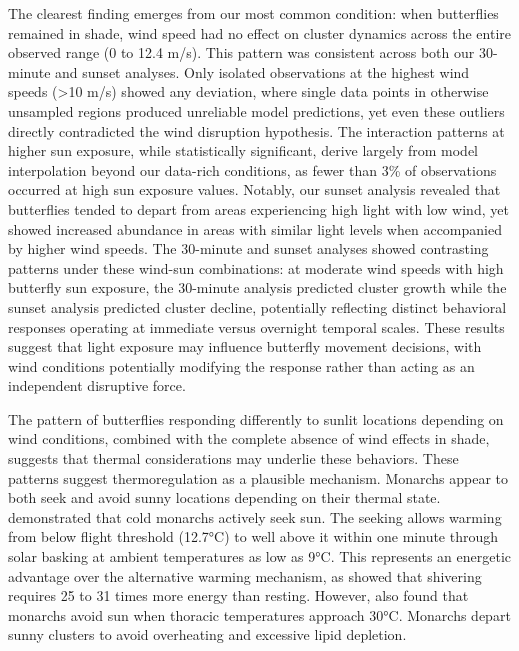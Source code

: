 The clearest finding emerges from our most common condition: when butterflies remained in shade, wind speed had no effect on cluster dynamics across the entire observed range (0 to 12.4 m/s). This pattern was consistent across both our 30-minute and sunset analyses. Only isolated observations at the highest wind speeds (>10 m/s) showed any deviation, where single data points in otherwise unsampled regions produced unreliable model predictions, yet even these outliers directly contradicted the wind disruption hypothesis. The interaction patterns at higher sun exposure, while statistically significant, derive largely from model interpolation beyond our data-rich conditions, as fewer than 3\% of observations occurred at high sun exposure values. Notably, our sunset analysis revealed that butterflies tended to depart from areas experiencing high light with low wind, yet showed increased abundance in areas with similar light levels when accompanied by higher wind speeds. The 30-minute and sunset analyses showed contrasting patterns under these wind-sun combinations: at moderate wind speeds with high butterfly sun exposure, the 30-minute analysis predicted cluster growth while the sunset analysis predicted cluster decline, potentially reflecting distinct behavioral responses operating at immediate versus overnight temporal scales. These results suggest that light exposure may influence butterfly movement decisions, with wind conditions potentially modifying the response rather than acting as an independent disruptive force.

The pattern of butterflies responding differently to sunlit locations depending on wind conditions, combined with the complete absence of wind effects in shade, suggests that thermal considerations may underlie these behaviors. These patterns suggest thermoregulation as a plausible mechanism. Monarchs appear to both seek and avoid sunny locations depending on their thermal state. \textcite{mastersMonarchButterflyDanaus1988} demonstrated that cold monarchs actively seek sun. The seeking allows warming from below flight threshold (12.7°C) to well above it within one minute through solar basking at ambient temperatures as low as 9°C. This represents an energetic advantage over the alternative warming mechanism, as \textcite{kammerThoracicTemperatureShivering1970} showed that shivering requires 25 to 31 times more energy than resting. However, \textcite{mastersMonarchButterflyDanaus1988} also found that monarchs avoid sun when thoracic temperatures approach 30°C. Monarchs depart sunny clusters to avoid overheating and excessive lipid depletion.

